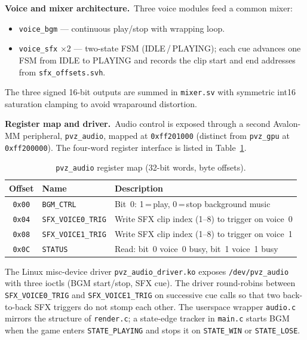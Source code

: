 \documentclass[11pt,letterpaper]{article}
\begin{document}
\textbf{Voice and mixer architecture.}\ Three voice modules feed a
common mixer:
\begin{itemize}[nosep]
  \item \texttt{voice\_bgm} --- continuous play/stop with wrapping loop.
  \item \texttt{voice\_sfx} $\times 2$ --- two-state FSM
    (IDLE\,/\,PLAYING); each cue advances one FSM from IDLE to PLAYING
    and records the clip start and end addresses from
    \texttt{sfx\_offsets.svh}.
\end{itemize}
The three signed 16-bit outputs are summed in \texttt{mixer.sv} with
symmetric int16 saturation clamping to avoid wraparound distortion.

\textbf{Register map and driver.}\ Audio control is exposed through a
second Avalon-MM peripheral, \texttt{pvz\_audio}, mapped at
\texttt{0xff201000} (distinct from \texttt{pvz\_gpu} at
\texttt{0xff200000}).  The four-word register interface is listed in
Table~\ref{tab:audio-regmap}.

\begin{table}[H]
\centering
\caption{\texttt{pvz\_audio} register map (32-bit words, byte offsets).}
\label{tab:audio-regmap}
\small
\begin{tabular}{c l l}
\toprule
\textbf{Offset} & \textbf{Name} & \textbf{Description} \\
\midrule
\texttt{0x00} & \texttt{BGM\_CTRL}       & Bit~0: 1\,=\,play, 0\,=\,stop background music \\
\texttt{0x04} & \texttt{SFX\_VOICE0\_TRIG} & Write SFX clip index (1--8) to trigger on voice~0 \\
\texttt{0x08} & \texttt{SFX\_VOICE1\_TRIG} & Write SFX clip index (1--8) to trigger on voice~1 \\
\texttt{0x0C} & \texttt{STATUS}          & Read: bit~0 voice~0 busy, bit~1 voice~1 busy \\
\bottomrule
\end{tabular}
\end{table}

The Linux misc-device driver \texttt{pvz\_audio\_driver.ko} exposes
\texttt{/dev/pvz\_audio} with three ioctls (BGM start/stop, SFX cue).
The driver round-robins between \texttt{SFX\_VOICE0\_TRIG} and
\texttt{SFX\_VOICE1\_TRIG} on successive cue calls so that two
back-to-back SFX triggers do not stomp each other.  The userspace
wrapper \texttt{audio.c} mirrors the structure of \texttt{render.c}; a
state-edge tracker in \texttt{main.c} starts BGM when the game enters
\texttt{STATE\_PLAYING} and stops it on \texttt{STATE\_WIN} or
\texttt{STATE\_LOSE}.
\end{document}
